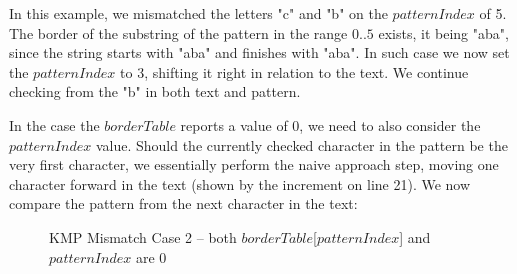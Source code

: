 In this example, we mismatched the letters "c" and "b" on the $patternIndex$ of 5. The border of the substring of the pattern in the range $0..5$ exists, it being "aba", since the string starts with "aba" and finishes with "aba". In such case we now set the $patternIndex$ to 3, shifting it right in relation to the text.  We continue checking from the "b" in both text and pattern.

In the case the $borderTable$ reports a value of 0, we need to also consider the $patternIndex$ value. Should the currently checked character in the pattern be the very first character, we essentially perform the naive approach step, moving one character forward in the text (shown by the increment on line 21). We now compare the pattern from the next character in the text: 


\begin{figure}[H]
    \centering
    \caption{KMP Mismatch Case 2 -- both $borderTable$[$patternIndex$] and $patternIndex$ are 0 }
    \label{kmp:mismatch-case-2}
\end{figure}


